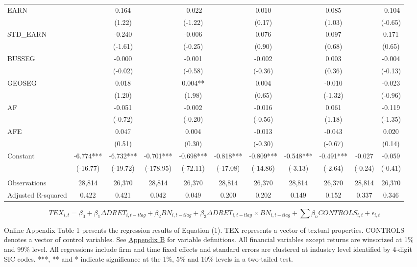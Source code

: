 \begin{table}
\begin{center}
\begin{tabular}{lcccccccccc}
			EARN &   & 0.164 &   & -0.022 &   & 0.010 &   & 0.085 &   & -0.104 \\
			&   & (1.22) &   & (-1.22) &   & (0.17) &   & (1.03) &   & (-0.65) \\
			STD\_EARN &   & -0.240 &   & -0.006 &   & 0.076 &   & 0.097 &   & 0.171 \\
			&   & (-1.61) &   & (-0.25) &   & (0.90) &   & (0.68) &   & (0.65) \\
			BUSSEG &   & -0.000 &   & -0.001 &   & -0.002 &   & 0.003 &   & -0.004 \\
			&   & (-0.02) &   & (-0.58) &   & (-0.36) &   & (0.36) &   & (-0.13) \\
			GEOSEG &   & 0.018 &   & 0.004** &   & 0.004 &   & -0.010 &   & -0.023 \\
			&   & (1.20) &   & (1.98) &   & (0.65) &   & (-1.32) &   & (-0.96) \\
			AF &   & -0.051 &   & -0.002 &   & -0.016 &   & 0.061 &   & -0.119 \\
			&   & (-0.72) &   & (-0.20) &   & (-0.56) &   & (1.18) &   & (-1.35) \\
			AFE &   & 0.047 &   & 0.004 &   & -0.013 &   & -0.043 &   & 0.020 \\
			&   & (0.51) &   & (0.30) &   & (-0.30) &   & (-0.67) &   & (0.14) \\
			Constant & -6.774*** & -6.732*** & -0.701*** & -0.698*** & -0.818*** & -0.809*** & -0.548*** & -0.491*** & -0.027 & -0.059 \\
			& (-16.77) & (-19.72) & (-178.95) & (-72.11) & (-17.08) & (-14.86) & (-3.13) & (-2.64) & (-0.24) & (-0.41) \\
			&   &   &   &   &   &   &   &   &   &  \\
			Observations & 28,814 & 26,370 & 28,814 & 26,370 & 28,814 & 26,370 & 28,814 & 26,370 & 28,814 & 26,370 \\
			Adjusted R-squared & 0.422 & 0.421 & 0.042 & 0.049 & 0.200 & 0.202 & 0.149 & 0.152 & 0.337 & 0.346 \\
			\bottomrule
			\bottomrule
		\end{tabular}%
	\end{center}
		\begin{footnotesize}
			\setcounter{equation}{0}
			\begin{equation}
				TEX_{i,t}=\beta_0+\beta_1\Delta DRET_{i,t-tlag}+\beta_2BN_{i,t-tlag}+\beta_3\Delta DRET_{i,t-tlag}\times 	BN_{i,t-tlag}+\sum\beta_nCONTROLS_{i,t}+\epsilon_{i,t}
			\end{equation}
			
			\noindent Online Appendix Table 1 presents the regression results of Equation (1). TEX represents a vector of textual properties. CONTROLS denotes a vector of control variables. See \hyperref[appb]{Appendix B} for variable definitions. All financial variables except returns are winsorized at 1\% and 99\% level. All regressions include firm and time fixed effects and standard errors are clustered at industry level identified by 4-digit SIC codes. ***, ** and * indicate significance at the 1\%, 5\% and 10\% levels in a two-tailed test.
		\end{footnotesize}
\end{table}%
